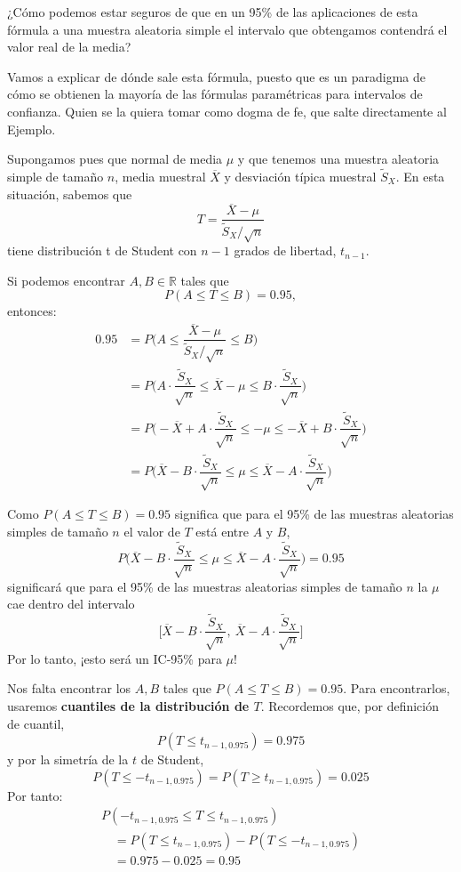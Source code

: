 \documentclass[
  spanish,
  letterpaper,
  DIV=11,
  numbers=noendperiod]{scrreprt}
\begin{document}
¿Cómo podemos estar seguros de que en un 95\% de las aplicaciones de
esta fórmula a una muestra aleatoria simple el intervalo que obtengamos
contendrá el valor real de la media?

Vamos a explicar de dónde sale esta fórmula, puesto que es un paradigma
de cómo se obtienen la mayoría de las fórmulas paramétricas para
intervalos de confianza. Quien se la quiera tomar como dogma de fe, que
salte directamente al Ejemplo.

Supongamos pues que normal de media \(\mu\) y que tenemos una muestra
aleatoria simple de tamaño \(n\), media muestral \(\overline{X}\) y
desviación típica muestral \(\widetilde{S}_X\). En esta situación,
sabemos que \[
T=\frac{\overline{X}-\mu}{\widetilde{S}_{X}/\sqrt{n}}
\] tiene distribución t de Student con \(n-1\) grados de libertad,
\(t_{n-1}\).

Si podemos encontrar \(A,B\in \mathbb{R}\) tales que \[
P(A\leqslant T\leqslant B)=0.95,
\] entonces: \[
\begin{array}{rl}
0.95\!\!\!\! & =P\Bigg(A\leqslant   \dfrac{\overline{X}-\mu}{\widetilde{S}_{X}/\sqrt{n}}\leqslant  B\Bigg)\\[2ex]
& =P\Bigg(A\cdot \dfrac{\widetilde{S}_X}{\sqrt{n}}\leqslant  \overline{X}-\mu \leqslant  B\cdot \dfrac{\widetilde{S}_X}{\sqrt{n}}\Bigg)\\[2ex]
& =P\Bigg(-\overline{X}+A\cdot \dfrac{\widetilde{S}_X}{\sqrt{n}}\leqslant  -\mu \leqslant  -\overline{X}+B\cdot \dfrac{\widetilde{S}_X}{\sqrt{n}}\Bigg)\\[2ex]
& =P\Bigg(\overline{X}-B\cdot \dfrac{\widetilde{S}_X}{\sqrt{n}}\leqslant  \mu \leqslant  \overline{X}-A\cdot \dfrac{\widetilde{S}_X}{\sqrt{n}}\Bigg)
\end{array}
\]

Como \(P(A\leqslant  T\leqslant  B)=0.95\) significa que para el 95\% de
las muestras aleatorias simples de tamaño \(n\) el valor de \(T\) está
entre \(A\) y \(B\), \[
P\Bigg(\overline{X}-B\cdot \frac{\widetilde{S}_X}{\sqrt{n}}\leqslant  \mu \leqslant  \overline{X}-A\cdot \frac{\widetilde{S}_X}{\sqrt{n}}\Bigg)=0.95
\] significará que para el 95\% de las muestras aleatorias simples de
tamaño \(n\) la \(\mu\) cae dentro del intervalo \[
\Bigg[\overline{X}-B\cdot \frac{\widetilde{S}_X}{\sqrt{n}},\ \overline{X}-A\cdot \frac{\widetilde{S}_X}{\sqrt{n}}\Bigg]
\] Por lo tanto, ¡esto será un IC-95\% para \(\mu\)!

Nos falta encontrar los \(A,B\) tales que
\(P(A\leqslant T\leqslant B)=0.95\). Para encontrarlos, usaremos
\textbf{cuantiles de la distribución de \(T\)}. Recordemos que, por
definición de cuantil, \[
P(T\leqslant t_{n-1,0.975})=0.975
\] y por la simetría de la \(t\) de Student, \[
P(T\leqslant  -t_{n-1,0.975})=P(T\geqslant t_{n-1,0.975})=0.025
\] Por tanto: \[
\begin{array}{l}
P(-t_{n-1,0.975}\leqslant  T\leqslant  t_{n-1,0.975})\\
\quad =P(T\leqslant  t_{n-1,0.975})-P(T\leqslant  -t_{n-1,0.975})\\
\quad =0.975-0.025=0.95
\end{array}
\]
\end{document}
